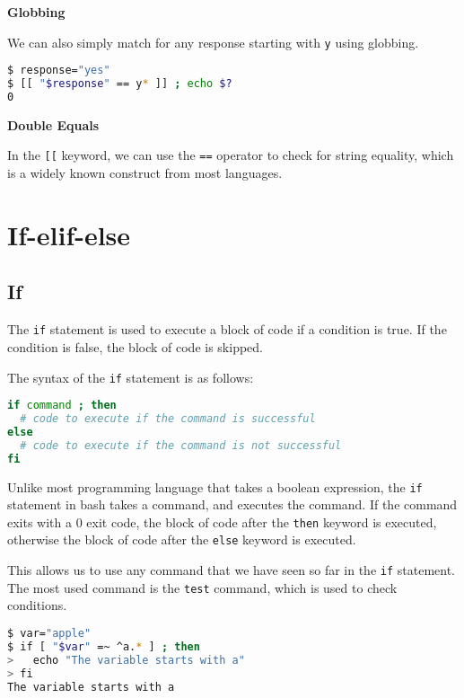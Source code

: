 \textbf{Globbing}

We can also simply match for any response starting with \lstinline|y| using globbing.

\begin{lstlisting}[language=bash]
$ response="yes"
$ [[ "$response" == y* ]] ; echo $?
0
\end{lstlisting}

\textbf{Double Equals}

In the \lstinline{[[} keyword, we can use the \lstinline{==} operator to check for string equality, which is a widely known construct from most languages.

\section{If-elif-else}

\subsection{If}

The \lstinline{if} statement is used to execute a block of code if a condition is true. If the condition is false, the block of code is skipped.

The syntax of the \lstinline{if} statement is as follows:

\begin{lstlisting}[language=bash]
if command ; then
  # code to execute if the command is successful
else
  # code to execute if the command is not successful
fi
\end{lstlisting}

Unlike most programming language that takes a boolean expression, the \lstinline{if} statement in bash takes a command, and executes the command.
If the command exits with a 0 exit code, the block of code after the \lstinline{then} keyword is executed, otherwise the block of code after the \lstinline{else} keyword is executed.

This allows us to use any command that we have seen so far in the \lstinline{if} statement.
The most used command is the \lstinline{test} command, which is used to check conditions.

\begin{lstlisting}[language=bash]
$ var="apple"
$ if [ "$var" =~ ^a.* ] ; then
>   echo "The variable starts with a"
> fi
The variable starts with a
\end{lstlisting}

